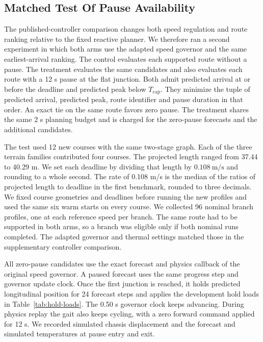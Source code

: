 \documentclass{ieeeaccess}
\begin{document}
\subsection{Matched Test Of Pause Availability}
\label{sec:matched-methods}

The published-controller comparison changes both speed regulation and route ranking relative to the fixed reactive planner. We therefore ran a second experiment in which both arms use the adapted speed governor and the same earliest-arrival ranking. The control evaluates each supported route without a pause. The treatment evaluates the same candidates and also evaluates each route with a 12 s pause at the flat junction. Both admit predicted arrival at or before the deadline and predicted peak below $T_\mathrm{cap}$. They minimize the tuple of predicted arrival, predicted peak, route identifier and pause duration in that order. An exact tie on the same route favors zero pause. The treatment shares the same 2 s planning budget and is charged for the zero-pause forecasts and the additional candidates.

The test used 12 new courses with the same two-stage graph. Each of the three terrain families contributed four courses. The projected length ranged from 37.44 to 40.29 m. We set each deadline by dividing that length by $0.108~\mathrm{m/s}$ and rounding to a whole second. The rate of 0.108 m/s is the median of the ratios of projected length to deadline in the first benchmark, rounded to three decimals. We fixed course geometries and deadlines before running the new profiles and used the same six warm starts on every course. We collected 96 nominal branch profiles, one at each reference speed per branch. The same route had to be supported in both arms, so a branch was eligible only if both nominal runs completed. The adapted governor and thermal settings matched those in the supplementary controller comparison.

All zero-pause candidates use the exact forecast and physics callback of the original speed governor. A paused forecast uses the same progress step and governor update clock. Once the first junction is reached, it holds predicted longitudinal position for 24 forecast steps and applies the development hold loads in Table~\ref{tab:hold-loads}. The 0.50 s governor clock keeps advancing. During physics replay the gait also keeps cycling, with a zero forward command applied for 12 s. We recorded simulated chassis displacement and the forecast and simulated temperatures at pause entry and exit.
\end{document}
